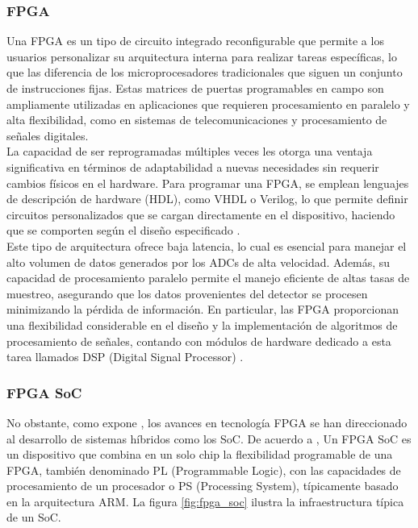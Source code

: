 \documentclass[]{book}
\begin{document}
\subsubsection{FPGA}
\noindent Una FPGA es un tipo de circuito integrado reconfigurable que permite a los usuarios personalizar su arquitectura interna para realizar tareas específicas, lo que las diferencia de los microprocesadores tradicionales que siguen un conjunto de instrucciones fijas. Estas matrices de puertas programables en campo son ampliamente utilizadas en aplicaciones que requieren procesamiento en paralelo y alta flexibilidad, como en sistemas de telecomunicaciones y procesamiento de señales digitales. \\

\noindent La capacidad de ser reprogramadas múltiples veces les otorga una ventaja significativa en términos de adaptabilidad a nuevas necesidades sin requerir cambios físicos en el hardware. Para programar una FPGA, se emplean lenguajes de descripción de hardware (HDL), como VHDL o Verilog, lo que permite definir circuitos personalizados que se cargan directamente en el dispositivo, haciendo que se comporten según el diseño especificado \cite{brown2000fundamentals}.\\

\noindent Este tipo de arquitectura ofrece baja latencia, lo cual es esencial para manejar el alto volumen de datos generados por los ADCs de alta velocidad. Además, su capacidad de procesamiento paralelo permite el manejo eficiente de altas tasas de muestreo, asegurando que los datos provenientes del detector se procesen minimizando la pérdida de información. En particular, las FPGA proporcionan una flexibilidad considerable en el diseño y la implementación de algoritmos de procesamiento de señales, contando con módulos de hardware dedicado a esta tarea llamados DSP (Digital Signal Processor) \cite{meyer2007digital}.\\

\subsubsection{FPGA SoC}

\noindent No obstante, como expone \cite{bravo2020new}, los avances en tecnología FPGA se han direccionado al desarrollo de sistemas híbridos como los SoC. De acuerdo a \cite{amd_zynq_7000}, Un FPGA SoC es un dispositivo que combina en un solo chip la flexibilidad programable de una FPGA, también denominado PL (Programmable Logic), con las capacidades de procesamiento de un procesador o PS (Processing System), típicamente basado en la arquitectura ARM. La figura \ref{fig:fpga_soc} ilustra la infraestructura típica de un SoC. \\ 
\end{document}
